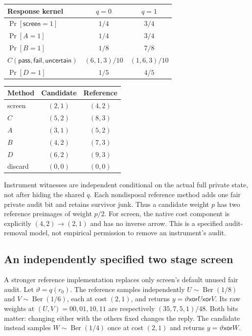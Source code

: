 \documentclass[11pt,a4paper]{article}
\theoremstyle{definition}
\begin{document}
\begin{center}
\begin{tabular}{@{}lcc@{}}
\toprule Response kernel&$q=0$&$q=1$\\\midrule
$\Pr[\mathsf{screen}=1]$&$1/4$&$3/4$\\
$\Pr[A=1]$&$1/4$&$3/4$\\
$\Pr[B=1]$&$1/8$&$7/8$\\
$C(\mathsf{pass},\mathsf{fail},\mathsf{uncertain})$&$(6,1,3)/10$&$(1,6,3)/10$\\
$\Pr[D=1]$&$1/5$&$4/5$\\
\bottomrule
\end{tabular}
\end{center}
\begin{center}
\begin{tabular}{@{}lcc@{}}
\toprule Method&Candidate&Reference\\\midrule
screen&$(2,1)$&$(4,2)$\\
$C$&$(5,2)$&$(8,3)$\\
$A$&$(3,1)$&$(5,2)$\\
$B$&$(4,2)$&$(7,3)$\\
$D$&$(6,2)$&$(9,3)$\\
discard&$(0,0)$&$(0,0)$\\
\bottomrule
\end{tabular}
\end{center}
Instrument witnesses are independent conditional on the actual full
private state, not after hiding the shared $q$. Each nondisposal reference
method adds one fair private audit bit and retains survivor junk. Thus
a candidate weight $p$ has two reference preimages of weight $p/2$.
For screen, the native cost component is explicitly
$(4,2)\to(2,1)$ and has no inverse arrow. This is a specified audit-removal
model, not empirical permission to remove an instrument's audit.

\subsection{An independently specified two stage screen}
A stronger reference implementation replaces only screen's default
unused fair audit. Let $\vartheta=q(r_0)$. The reference samples
independently $U\sim\operatorname{Ber}(1/8)$ and
$V\sim\operatorname{Ber}(1/6)$, each at cost $(2,1)$, and returns
$y=\vartheta\mathbin{\mathsf{xor}}U\mathbin{\mathsf{xor}}V$.
Its raw weights at $(U,V)=00,01,10,11$ are respectively
$(35,7,5,1)/48$. Both bits matter: changing either with the others
fixed changes the reply. The candidate instead samples
$W\sim\operatorname{Ber}(1/4)$ once at cost $(2,1)$ and returns
$y=\vartheta\mathbin{\mathsf{xor}}W$.
\end{document}
